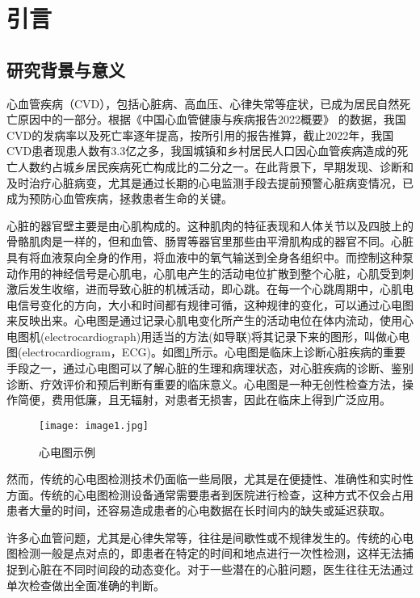 \section{引言}
\subsection{研究背景与意义}

心血管疾病（CVD），包括心脏病、高血压、心律失常等症状，已成为居民自然死亡原因中的一部分。根据《中国心血管健康与疾病报告2022概要》 \cite{中国心血管健康与疾病报告2022概要} 的数据，我国CVD的发病率以及死亡率逐年提高，按所引用的报告推算，截止2022年，我国CVD患者现患人数有3.3亿之多，我国城镇和乡村居民人口因心血管疾病造成的死亡人数约占城乡居民疾病死亡构成比的二分之一。在此背景下，早期发现、诊断和及时治疗心脏病变，尤其是通过长期的心电监测手段去提前预警心脏病变情况，已成为预防心血管疾病，拯救患者生命的关键。

心脏的器官壁主要是由心肌构成的。这种肌肉的特征表现和人体关节以及四肢上的骨骼肌肉是一样的，但和血管、肠胃等器官里那些由平滑肌构成的器官不同。心脏具有将血液泵向全身的作用，将血液中的氧气输送到全身各组织中。而控制这种泵动作用的神经信号是心肌电，心肌电产生的活动电位扩散到整个心脏，心肌受到刺激后发生收缩，进而导致心脏的机械活动，即心跳。在每一个心跳周期中，心肌电电信号变化的方向，大小和时间都有规律可循，这种规律的变化，可以通过心电图来反映出来。心电图是通过记录心肌电变化所产生的活动电位在体内流动，使用心电图机(electrocardiograph)用适当的方法(如导联)将其记录下来的图形，叫做心电图(electrocardiogram，ECG)。如图\ref{F.ECG_image}所示。心电图是临床上诊断心脏疾病的重要手段之一，通过心电图可以了解心脏的生理和病理状态，对心脏疾病的诊断、鉴别诊断、疗效评价和预后判断有重要的临床意义。心电图是一种无创性检查方法，操作简便，费用低廉，且无辐射，对患者无损害，因此在临床上得到广泛应用。

\begin{figure}[hbt]
    \centering
    \texttt{[image: image1.jpg]}
    \caption{心电图示例}
    \label{F.ECG_image}
\end{figure}

然而，传统的心电图检测技术仍面临一些局限，尤其是在便捷性、准确性和实时性方面。传统的心电图检测设备通常需要患者到医院进行检查，这种方式不仅会占用患者大量的时间，还容易造成患者的心电数据在长时间内的缺失或延迟获取。

许多心血管问题，尤其是心律失常等，往往是间歇性或不规律发生的。传统的心电图检测一般是点对点的，即患者在特定的时间和地点进行一次性检测，这样无法捕捉到心脏在不同时间段的动态变化。对于一些潜在的心脏问题，医生往往无法通过单次检查做出全面准确的判断。

